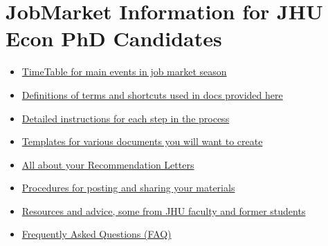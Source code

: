 \documentclass{\classes/econtex}
\begin{document}
\medskip


\section*{JobMarket Information for JHU Econ PhD Candidates}

\begin{itemize}
  \item \href{\pageurl/TimeTable}{TimeTable for main events in job market season}
  \item \href{\pageurl/Notation}{Definitions of terms and shortcuts used in docs provided here}
  \item \href{\pageurl/Steps}{Detailed instructions for each step in the process}
  \item \href{\bloburl/Templates}{Templates for various documents you will want to create}
  \item \href{\pageurl/RecLetters}{All about your Recommendation Letters}
  \item \href{\bloburl/JobMarketProceduresHelp.md}{Procedures for posting and sharing your materials}
  \item \href{\bloburl/Resources}{Resources and advice, some from JHU faculty and former students}
  \item \href{\pageurl/FAQ}{Frequently Asked Questions (FAQ)}
\end{itemize}
\end{document}

